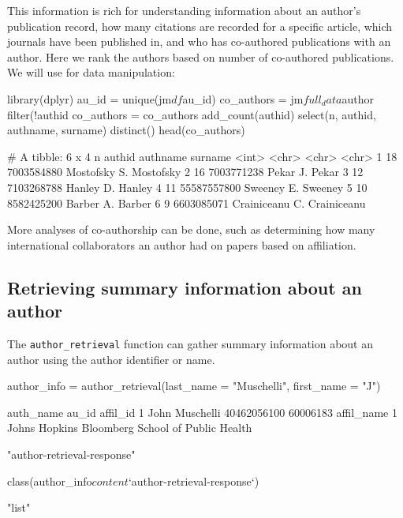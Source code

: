 This information is rich for understanding information about an author's
publication record, how many citations are recorded for a specific
article, which journals have been published in, and who has co-authored
publications with an author. Here we rank the authors based on number of
co-authored publications. We will use  \citep{dplyr} for
data manipulation:

\begin{Schunk}
\begin{Sinput}
library(dplyr)
au_id = unique(jm$df$au_id) 
co_authors = jm$full_data$author %
  filter(!authid %
co_authors = co_authors %
  add_count(authid) %
  select(n, authid, authname, surname) %
  distinct() %
head(co_authors)
\end{Sinput}
\begin{Soutput}
# A tibble: 6 x 4
      n authid      authname       surname    
  <int> <chr>       <chr>          <chr>      
1    18 7003584880  Mostofsky S.   Mostofsky  
2    16 7003771238  Pekar J.       Pekar      
3    12 7103268788  Hanley D.      Hanley     
4    11 55587557800 Sweeney E.     Sweeney    
5    10 8582425200  Barber A.      Barber     
6     9 6603085071  Crainiceanu C. Crainiceanu
\end{Soutput}
\end{Schunk}

More analyses of co-authorship can be done, such as determining how many
international collaborators an author had on papers based on
affiliation.

\hypertarget{retrieving-summary-information-about-an-author}{%
\subsection{Retrieving summary information about an
author}\label{retrieving-summary-information-about-an-author}}

The \texttt{author\_retrieval} function can gather summary information
about an author using the author identifier or name.

\begin{Schunk}
\begin{Sinput}
author_info = author_retrieval(last_name = "Muschelli", first_name = "J")
\end{Sinput}
\begin{Soutput}
       auth_name       au_id affil_id
1 John Muschelli 40462056100 60006183
                                       affil_name
1 Johns Hopkins Bloomberg School of Public Health
\end{Soutput}
\begin{Soutput}
[1] "author-retrieval-response"
\end{Soutput}
\begin{Sinput}
class(author_info$content$`author-retrieval-response`)
\end{Sinput}
\begin{Soutput}
[1] "list"
\end{Soutput}
\end{Schunk}

